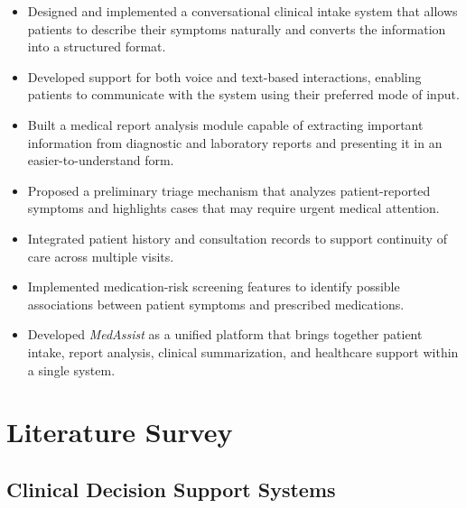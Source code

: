 \documentclass[conference]{IEEEtran}
\begin{document}
\begin{itemize}
    \item Designed and implemented a conversational clinical intake system that allows patients to describe their symptoms naturally and converts the information into a structured format.

    \item Developed support for both voice and text-based interactions, enabling patients to communicate with the system using their preferred mode of input.

    \item Built a medical report analysis module capable of extracting important information from diagnostic and laboratory reports and presenting it in an easier-to-understand form.

    \item Proposed a preliminary triage mechanism that analyzes patient-reported symptoms and highlights cases that may require urgent medical attention.

    \item Integrated patient history and consultation records to support continuity of care across multiple visits.

    \item Implemented medication-risk screening features to identify possible associations between patient symptoms and prescribed medications.

    \item Developed \textit{MedAssist} as a unified platform that brings together patient intake, report analysis, clinical summarization, and healthcare support within a single system.
\end{itemize}


\section{Literature Survey}

\subsection{Clinical Decision Support Systems}
\end{document}
